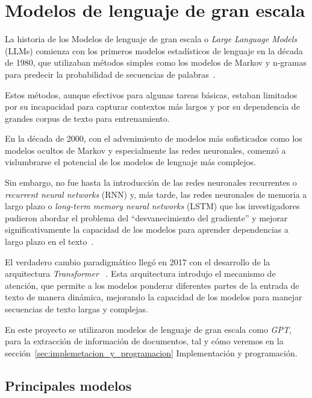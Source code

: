 \section{Modelos de lenguaje de gran escala}

La historia de los Modelos de lenguaje de gran escala o \textit{Large Language Models} (LLMs) comienza con los
primeros modelos estadísticos de lenguaje en la década de 1980, que utilizaban métodos simples como los modelos de
Markov y n-gramas para predecir la probabilidad de secuencias de palabras~\cite{article_jelinek_1997}.

Estos métodos, aunque efectivos para algunas tareas básicas, estaban limitados por su incapacidad para capturar
contextos más largos y por su dependencia de grandes corpus de texto para entrenamiento.

En la década de 2000, con el advenimiento de modelos más sofisticados como los modelos ocultos de Markov y especialmente
las redes neuronales, comenzó a vislumbrarse el potencial de los modelos de lenguaje más complejos.

Sin embargo, no fue hasta la introducción de las redes neuronales recurrentes o \textit{recurrent neural networks} (RNN)
y, más tarde, las redes neuronales de memoria a largo plazo o \textit{long-term memory neural networks} (LSTM) que
los investigadores pudieron abordar el problema del ``desvanecimiento del gradiente'' y mejorar significativamente la
capacidad de los modelos para aprender dependencias a largo plazo en el texto~\cite{article_hochreiter_1997}.

El verdadero cambio paradigmático llegó en 2017 con el desarrollo de la arquitectura \textit{Transformer}
~\cite{article_vaswani_2017}.
Esta arquitectura introdujo el mecanismo de atención, que permite a los modelos ponderar diferentes partes de la entrada
de texto de manera dinámica, mejorando la capacidad de los modelos para manejar secuencias de texto largas y complejas.

En este proyecto se utilizaron modelos de lenguaje de gran escala como \textit{GPT}, para la extracción de información
de documentos, tal y cómo veremos en la sección~\ref{sec:implemetacion_y_programacion} Implementación y programación.

\subsection{Principales modelos}


